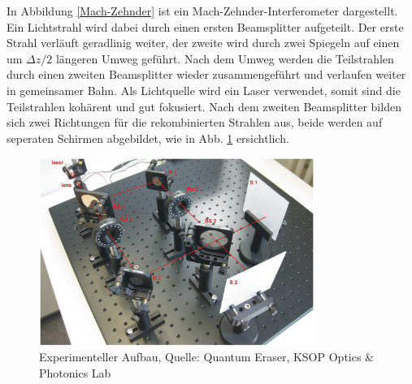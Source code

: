 \documentclass{include/thesisclass3}
\begin{document}
In Abbildung \ref{Mach-Zehnder} ist ein Mach-Zehnder-Interferometer dargestellt. Ein Lichtstrahl wird dabei durch einen ersten Beamsplitter aufgeteilt. Der erste Strahl verläuft geradlinig weiter, der zweite wird durch zwei Spiegeln auf einen um $\Delta z/2$ längeren Umweg geführt. Nach dem Umweg werden die Teilstrahlen durch einen zweiten Beamsplitter wieder zusammengeführt und verlaufen weiter in gemeinsamer Bahn. Als Lichtquelle wird ein Laser verwendet, somit sind die Teilstrahlen kohärent und gut fokusiert. Nach dem zweiten Beamsplitter bilden sich zwei Richtungen für die rekombinierten Strahlen aus, beide werden auf seperaten Schirmen abgebildet, wie in Abb. \ref{Aufbau} ersichtlich. 
\begin{figure}[H]
	\begin{center}
		\includegraphics[width=0.8\textwidth]{images/Aufbau.png}
		\caption{Experimenteller Aufbau, Quelle: Quantum Eraser, KSOP Optics \& Photonics Lab}
		\label{Aufbau}
	\end{center}
\end{figure}
\end{document}
